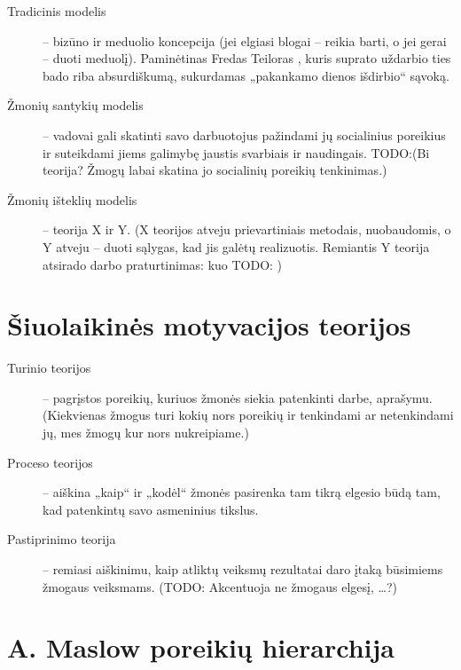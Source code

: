 \begin{description}
  \item[Tradicinis modelis] – bizūno ir meduolio koncepcija (jei elgiasi
    blogai – reikia barti, o jei gerai – duoti meduolį). Paminėtinas
    Fredas Teiloras , kuris suprato uždarbio
    ties bado riba absurdiškumą, sukurdamas „pakankamo dienos
    išdirbio“ sąvoką.
  \item[Žmonių santykių modelis] – vadovai gali skatinti savo darbuotojus
    pažindami jų socialinius poreikius ir suteikdami jiems galimybę
    jaustis svarbiais ir naudingais. TODO:(Bi~ teorija? Žmogų labai skatina
    jo socialinių poreikių tenkinimas.)
  \item[Žmonių išteklių modelis] – teorija X ir Y. (X teorijos atveju
    prievartiniais metodais, nuobaudomis, o Y atveju – duoti sąlygas,
    kad jis galėtų realizuotis. Remiantis Y teorija atsirado darbo
    praturtinimas: kuo TODO: )
\end{description}

\section{Šiuolaikinės motyvacijos teorijos}

\begin{description}
  \item[Turinio teorijos] – pagrįstos poreikių, kuriuos žmonės siekia 
    patenkinti darbe, aprašymu. (Kiekvienas žmogus turi kokių nors
    poreikių ir tenkindami ar netenkindami jų, mes žmogų kur nors
    nukreipiame.)
  \item[Proceso teorijos] – aiškina „kaip“ ir „kodėl“ žmonės pasirenka
    tam tikrą elgesio būdą tam, kad patenkintų savo asmeninius tikslus.
  \item[Pastiprinimo teorija] – remiasi aiškinimu, kaip atliktų
    veiksmų rezultatai daro įtaką būsimiems žmogaus veiksmams. (TODO:
    Akcentuoja ne žmogaus elgesį, …?)
\end{description}

\section{A. Maslow poreikių hierarchija}

\label{sec:maslow}

